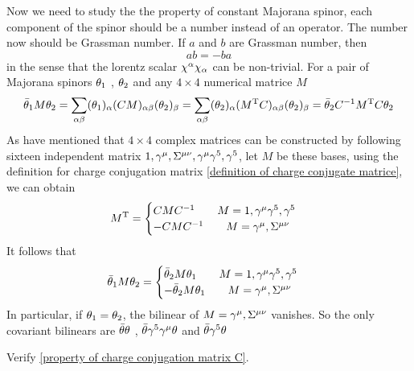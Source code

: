 Now we need to study the the property of constant Majorana spinor, each component of the spinor should be a number instead of an operator. The number now should be Grassman number. If $a$ and $b$ are Grassman number, then
\begin{equation}
   ab = -ba 
\end{equation}
in the sense that the lorentz scalar $\chi^{\alpha}\chi_{\alpha}$ can be non-trivial. For a pair of Majorana spinors $\theta_1$ , $\theta_2$ and any $4\times4$ numerical matrice $M$ 
\begin{equation}
\bar{\theta}_1 M \theta_2 
= \sum_{\alpha\beta} (\theta_{1})_{\alpha} (CM)_{\alpha\beta}(\theta_2)_{\beta}
= \sum_{\alpha\beta} (\theta_2)_{\alpha} (M^{\text{T}}C)_{\alpha\beta}(\theta_2)_{\beta}
= \bar{\theta}_2 C^{-1} M^{\text{T}} C \theta_2
\end{equation}
As have mentioned that $4\times4$ complex matrices can be constructed by following sixteen independent matrix $1,\gamma^{\mu},\Sigma^{\mu\nu},\gamma^{\mu}\gamma^5,\gamma^5$, let $M$ be these bases, using the definition for charge conjugation matrix \eqref{definition of charge conjugate matrice}, we can obtain
\begin{equation}\label{property of charge conjugation matrix C}
  M^{\text{T}} = 
  \begin{cases}
     C M C^{-1}   \qquad  M = 1, \gamma^{\mu}\gamma^5, \gamma^5 \\
     -C M C^{-1}   \qquad M = \gamma^{\mu}, \Sigma^{\mu\nu} 
\end{cases}
\end{equation}
It follows that 
\begin{equation}
\bar{\theta}_1 M \theta_2 =
  \begin{cases}
    \bar{\theta}_2 M \theta_1   \qquad  M = 1, \gamma^{\mu}\gamma^5, \gamma^5 \\
    -\bar{\theta}_2 M \theta_1    \qquad M = \gamma^{\mu}, \Sigma^{\mu\nu}
  \end{cases}
\end{equation}
In particular, if $\theta_1 = \theta_2$,  the bilinear of $M = \gamma^{\mu}, \Sigma^{\mu\nu}$ vanishes. So the only covariant bilinears are $\bar{\theta}\theta$ , $\bar{\theta}\gamma^{5}\gamma^{\mu}\theta$ and $\bar{\theta}\gamma^{5}\theta$  

\begin{Exe}\qquad
	
	Verify \ref{property of charge conjugation matrix C}.
\end{Exe}